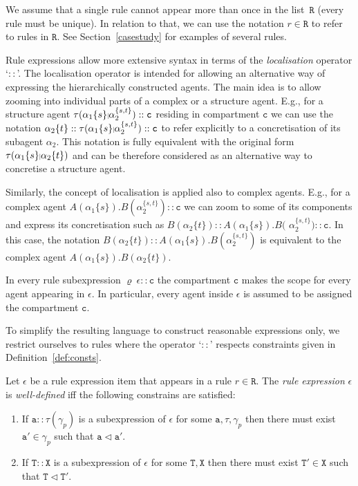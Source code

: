 \documentclass{entcs}
\renewcommand{\~}[0]{\texttildelow}
\newcommand{\pipe}{{}{\scalebox{.6}{$|$}}{}}
\begin{document}
We assume that a single rule cannot appear more than once in the list~$\mathtt{R}$ (every rule must be unique). In relation to that, we can use the notation $r\in\mathtt{R}$ to refer to rules in $\mathtt{R}$. See Section~\ref{casestudy} for examples of several rules.

Rule expressions allow more extensive syntax in terms of the \textit{localisation} operator `$::$'. The localisation operator is intended for allowing an alternative way of expressing the hierarchically constructed agents. The main idea is to allow zooming into individual parts of a complex or a structure agent. E.g., for a structure agent {\small $\tau(\alpha_1\{s\}\pipe\alpha_2^{\{s,t\}})::\mathtt{c}$} residing in compartment $\mathtt{c}$ we can use the notation {\small $\alpha_2\{t\}::\tau(\alpha_1\{s\}\pipe\alpha_2^{\{s,t\}})::\mathtt{c}$} to refer explicitly to a concretisation of its subagent $\alpha_2$. This notation is fully equivalent with the original form {\small $\tau(\alpha_1\{s\}\pipe\alpha_2{\{t\}})$} and can be therefore considered as an alternative way to concretise a structure agent. 

Similarly, the concept of localisation is applied also to complex agents. E.g., for a complex agent {\small $A(\alpha_1\{s\}).B(\alpha_2^{\{s,t\}})::\mathtt{c}$} we can zoom to some of its components and express its concretisation such as {\small $B(\alpha_2\{t\})::A(\alpha_1\{s\}).B($ $\alpha_2^{\{s,t\}})::\mathtt{c}$}. In this case, the notation {\small $B(\alpha_2\{t\})::A(\alpha_1\{s\}).B(\alpha_2^{\{s,t\}})$} is equivalent to the complex agent {\small $A(\alpha_1\{s\}).B(\alpha_2\{t\})$}.

In every rule subexpression $\varrho~\epsilon::\mathtt{c}$ the compartment $\mathtt{c}$ makes the scope for every agent appearing in $\epsilon$. In particular, every agent inside $\epsilon$ is assumed to be assigned the compartment $\mathtt{c}$.

To simplify the resulting language to construct reasonable expressions only, we restrict ourselves to rules where the operator `$::$' respects constraints given in Definition~\ref{def:consts}.

\begin{definition}
\label{def:consts}
Let $\epsilon$ be a rule expression item that appears in a rule $r\in\mathtt{R}$. The \emph{rule expression} $\epsilon$ is \emph{well-defined} iff the following constrains are satisfied:

\begin{enumerate}
 \item If $\mathtt{a}::\tau(\gamma_p)$ is a subexpression of $\epsilon$ for some $\mathtt{a},\tau,\gamma_p$ then there must exist $\mathtt{a}' \in \gamma_p$ such that $\mathtt{a} \lhd \mathtt{a}'$.

\item If $\mathtt{T}::\mathtt{X}$ is a subexpression of $\epsilon$ for some $\mathtt{T},\mathtt{X}$ then there must exist $\mathtt{T}' \in \mathtt{X}$ such that $\mathtt{T} \lhd \mathtt{T}'$.

\end{enumerate}
\end{definition}
\end{document}
